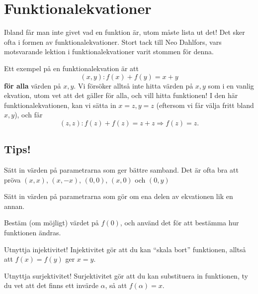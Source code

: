 \newpage




\section{Funktionalekvationer}

Ibland får man inte givet vad en funktion är, utom måste lista ut det! Det sker ofta i formen av funktionalekvationer. Stort tack till Neo Dahlfors, vars motsvarande lektion i funktionalekvationer varit stommen för denna.

\begin{exempel}
	Ett exempel på en funktionalekvation är att
	\[
		(x,y): f(x) + f(y) = x + y
	\]
	\textbf{för alla} värden på \(x, y\). Vi försöker alltså inte hitta värden på \(x, y\) som i en vanlig ekvation, utom vet att det gäller för alla, och vill hitta funktionen! 
	I den här funktionalekvationen, kan vi sätta in \(x=z, y=z\) (eftersom vi får välja fritt bland \(x, y\)), och får
	\[
		(z, z) : f(z) + f(z) = z + z \Rightarrow f(z) = z.
	\]
\end{exempel}

\subsection{Tips!} %
\setcounter{theorem}{0}
\begin{tips}[Substitution]
	Sätt in värden på parametrarna som ger bättre samband. Det är ofta bra att pröva \(\left(x, x\right)\), \((x, -x)\), \((0, 0)\), \((x, 0)\) och \((0, y)\) 
\end{tips}

\begin{tips}[Symmetri]
	Sätt in värden på parametrarna som gör om ena delen av ekvationen lik en annan.
\end{tips}

\begin{tips}[Bestäm \(f(0)\)]
	Bestäm (om möjligt) värdet på \(f(0)\), och använd det för att bestämma hur funktionen ändras.
\end{tips}

\begin{tips}
	Utnyttja injektivitet! Injektivitet gör att du kan ``skala bort'' funktionen, alltså att \(f(x) = f(y)\) ger \(x = y\).
\end{tips}

\begin{tips}
	Utnyttja surjektivitet! Surjektivitet gör att du kan substituera in funktionen, ty du vet att det finns ett invärde \(\alpha \), så att \(f(\alpha ) = x\).
\end{tips}

